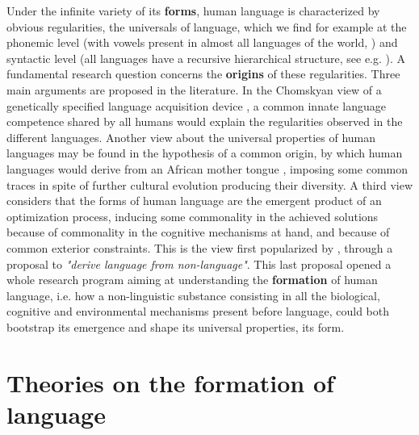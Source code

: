 \documentclass[letterpaper]{article} %
\begin{document}
Under the infinite variety of its \textbf{forms}, human language is characterized by obvious regularities, the universals of language, which we find for example at the phonemic level (with vowels present in almost all languages of the world, \cite{Maddieson1989}) and syntactic level (all languages have a recursive hierarchical structure, see e.g. \cite{pinker1990natural}). A fundamental research question concerns the \textbf{origins} of these regularities. Three main arguments are proposed in the literature. In the Chomskyan view of a genetically specified language acquisition device \cite{Chomsky1965}, a common innate language competence shared by all humans would explain the regularities observed in the different languages. Another view about the universal properties of human languages may be found in the hypothesis of a common origin, by which human languages would derive from an African mother tongue \cite{Ruhlen1996}, imposing some common traces in spite of further cultural evolution producing their diversity. A third view considers that the forms of human language are the emergent product of an optimization process, inducing some commonality in the achieved solutions because of commonality in the cognitive mechanisms at hand, and because of common exterior constraints. This is the view first popularized by \cite{lindblom1984}, through a proposal to \textit{"derive language from non-language"}. This last proposal opened a whole research program aiming at understanding the \textbf{formation} of human language, i.e. how a non-linguistic substance consisting in all the biological, cognitive and environmental mechanisms present before language, could both bootstrap its emergence and shape its universal properties, its form. 

\section{Theories on the formation of language}
\end{document}
